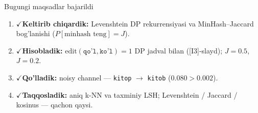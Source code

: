 \documentclass[aspectratio=169,11pt]{beamer}
\newcommand{\bajarildi}{{\color{deepgreen}\large$\checkmark$}\;}
\begin{document}
\begin{frame}{Bugungi maqsadlar bajarildi}
  \begin{enumerate}\setlength\itemsep{6pt}
    \item \bajarildi \textbf{Keltirib chiqardik:} Levenshtein DP
          rekurrensiyasi va MinHash--Jaccard bog'lanishi
          ($P[\text{minhash teng}]=J$).
    \item \bajarildi \textbf{Hisobladik:}
          $\text{edit}(\texttt{qo'l},\texttt{ko'l})=1$ DP jadval bilan
          ([I3]-slayd); $J=0.5$, $J=0.2$.
    \item \bajarildi \textbf{Qo'lladik:} noisy channel ---
          \texttt{kitop} $\to$ \texttt{kitob} ($0.080 > 0.002$).
    \item \bajarildi \textbf{Taqqosladik:} aniq k-NN va taxminiy LSH;
          Levenshtein / Jaccard / kosinus --- qachon qaysi.
  \end{enumerate}
\end{frame}
\end{document}
